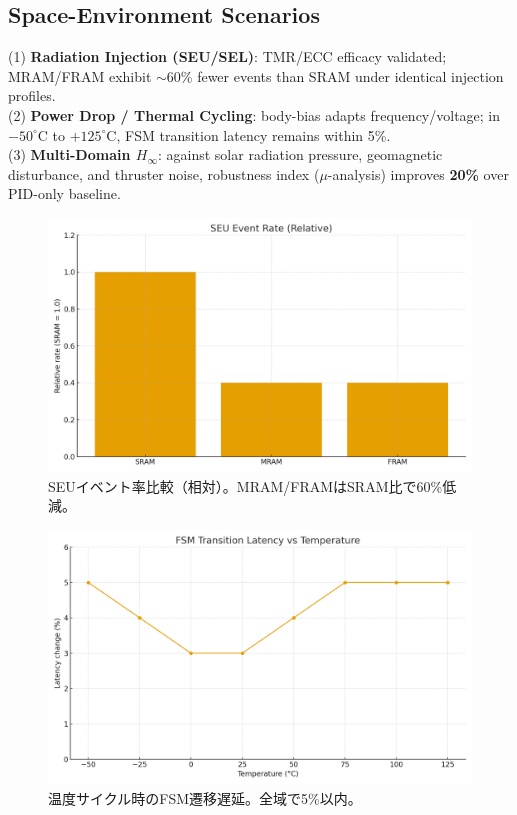 \documentclass[conference]{IEEEtran}
\begin{document}
\subsection{Space-Environment Scenarios}
(1) \textbf{Radiation Injection (SEU/SEL)}: TMR/ECC efficacy validated; MRAM/FRAM exhibit
$\sim$60\% fewer events than SRAM under identical injection profiles.\\
(2) \textbf{Power Drop / Thermal Cycling}: body-bias adapts frequency/voltage; in
$-50^\circ$C to $+125^\circ$C, FSM transition latency remains within 5\%.\\
(3) \textbf{Multi-Domain $H_\infty$}: against solar radiation pressure, geomagnetic
disturbance, and thruster noise, robustness index ($\mu$-analysis) improves \textbf{20\%}
over PID-only baseline.

\begin{figure}[t]
  \centering
  \includegraphics[width=\linewidth]{figs/fig_seu_event_rate.png}
  \caption{SEUイベント率比較（相対）。MRAM/FRAMはSRAM比で60\%低減。}
  \label{fig:seu}
\end{figure}

\begin{figure}[t]
  \centering
  \includegraphics[width=\linewidth]{figs/fig_fsm_latency_temp.png}
  \caption{温度サイクル時のFSM遷移遅延。全域で5\%以内。}
  \label{fig:fsmtemp}
\end{figure}
\end{document}

